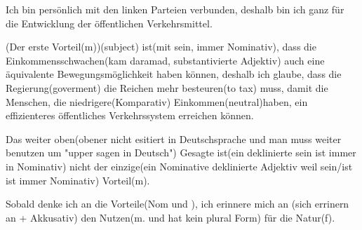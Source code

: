 \documentclass[a4paper,11pt]{article}
\begin{document}
      Ich bin persönlich mit den linken Parteien verbunden, deshalb bin ich ganz für  die Entwicklung der öffentlichen Verkehrsmittel.

      (Der erste Vorteil(m))(subject) ist(mit sein, immer Nominativ), dass die Einkommensschwachen(kam daramad, substantivierte Adjektiv)  auch eine äquivalente Bewegungsmöglichkeit haben können, deshalb ich glaube, dass die Regierung(goverment)  die Reichen mehr besteuren(to tax) muss, damit die Menschen, die niedrigere(Komparativ) Einkommen(neutral)haben, ein effizienteres öffentliches Verkehrssystem erreichen können.

      Das weiter oben(obener nicht esitiert in Deutschsprache und  man muss weiter benutzen um "upper sagen in Deutsch") Gesagte ist(ein deklinierte sein ist immer in Nominativ) nicht der einzige(ein Nominative deklinierte Adjektiv weil sein/ist ist immer Nominativ) Vorteil(m).

      Sobald denke ich an die Vorteile(Nom und ), ich erinnere mich an (sich errinern an + Akkusativ) den Nutzen(m. und hat kein plural Form) für die Natur(f).
\end{document}
